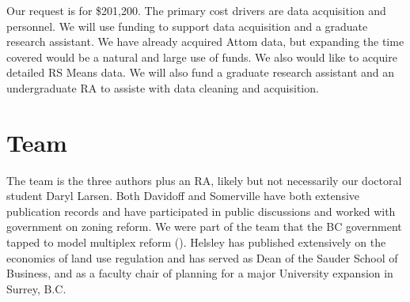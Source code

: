 \documentclass[12pt]{article}
\begin{document}
Our request is for \$201,200. The primary cost drivers are data acquisition and personnel. We will use funding to support data acquisition and a graduate research assistant. We have already acquired Attom data, but expanding the time covered would be a natural and large use of funds. We also would like to acquire detailed RS Means data. We will also fund a graduate research assistant and an undergraduate RA to assiste with data cleaning and acquisition.

\section{Team}

The team is the three authors plus an RA, likely but not necessarily our doctoral student Daryl Larsen. Both Davidoff and Somerville have both extensive publication records and have participated in public discussions and worked with government on zoning reform. We were part of the team that the BC government tapped to model multiplex reform (\textcite{vonBergmann_etal_2023}). Helsley has published extensively on the economics of land use regulation and has served as Dean of the Sauder School of Business, and as a faculty chair of planning for a major University expansion in Surrey, B.C.

\printbibliography
\end{document}
